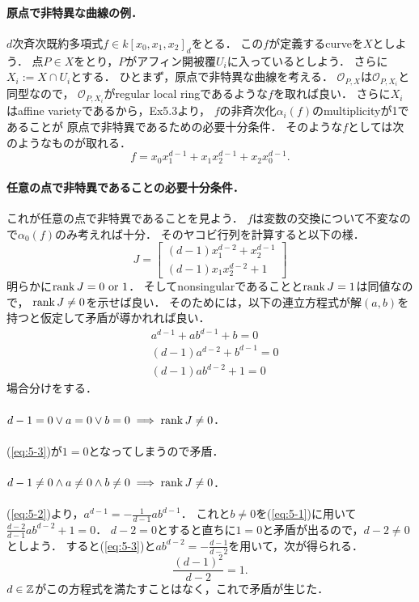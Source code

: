 \documentclass[a4paper]{jsarticle}
\begin{document}
    \paragraph{原点で非特異な曲線の例．}
    $d$次斉次既約多項式$f \in k[x_0, x_1, x_2]_d$をとる．
    この$f$が定義するcurveを$X$としよう．
    点$P \in X$をとり，$P$がアフィン開被覆$U_i$に入っているとしよう．
    さらに$X_i:=X \cap U_i$とする．
    ひとまず，原点で非特異な曲線を考える．
    $\mathcal{O}_{P,X}$は$\mathcal{O}_{P,X_i}$と同型なので，
    $\mathcal{O}_{P,X_i}$がregular local ringであるような$f$を取れば良い．
    さらに$X_i$はaffine varietyであるから，Ex5.3より，
    $f$の非斉次化$\alpha_i(f)$のmultiplicityが1であることが
    原点で非特異であるための必要十分条件．
    そのような$f$としては次のようなものが取れる．
    \[ f=x_0 x_1^{d-1}+x_1 x_2^{d-1}+x_2 x_0^{d-1}. \]

    \paragraph{任意の点で非特異であることの必要十分条件．}
    これが任意の点で非特異であることを見よう．
    $f$は変数の交換について不変なので$\alpha_0(f)$のみ考えれば十分．
    そのヤコビ行列を計算すると以下の様．
    \[
        J=
        \begin{bmatrix}
            (d-1) x_1^{d-2}+x_2^{d-1} \\
            (d-1) x_1 x_2^{d-2}+1
        \end{bmatrix}
    \]
    明らかに$\operatorname{rank} J=0 \text{ or } 1$．
    そしてnonsingularであることと$\operatorname{rank} J=1$は同値なので，
    $\operatorname{rank} J \neq 0$を示せば良い．
    そのためには，以下の連立方程式が解$(a,b)$を持つと仮定して矛盾が導かれれば良い．
    \begin{align}
        &a^{d-1}+ab^{d-1}+b = 0 \label{eq:5-1}\\
        &(d-1)a^{d-2}+b^{d-1} = 0 \label{eq:5-2} \\
        &(d-1)a b^{d-2}+1 = 0 \label{eq:5-3}
    \end{align}
    場合分けをする．

    \paragraph{$d-1=0 \lor a=0 \lor b=0 \implies \operatorname{rank} J \neq 0$.}
    (\ref{eq:5-3})が$1=0$となってしまうので矛盾．

    \paragraph{$d-1 \neq 0 \land a \neq 0 \land b \neq 0 \implies \operatorname{rank} J \neq 0$.}
    (\ref{eq:5-2})より，$a^{d-1}=-\frac{1}{d-1} ab^{d-1}$．
    これと$b \neq 0$を(\ref{eq:5-1})に用いて$\frac{d-2}{d-1} ab^{d-2}+1=0$．
    $d-2=0$とすると直ちに$1=0$と矛盾が出るので，$d-2 \neq 0$としよう．
    すると(\ref{eq:5-3})と$ab^{d-2}=-\frac{d-1}{d-2}$を用いて，次が得られる．
    \[ \frac{(d-1)^2}{d-2}=1. \]
    $d \in \mathbb{Z}$がこの方程式を満たすことはなく，これで矛盾が生じた．
\end{document}
